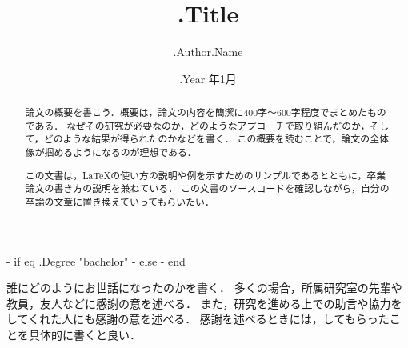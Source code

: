 \documentclass[12pt,twoside]{jsbook}
\begin{document}
\title{ {{ .Title }} }

{{- if eq .Degree "bachelor" }}
{{- else }}
{{- end }}

\author{ {{ .Author.Name }} }

\date{ {{ .Year }} 年1月}





\maketitle


\begin{abstract}
    論文の概要を書こう．概要は，論文の内容を簡潔に400字〜600字程度でまとめたものである．
    なぜその研究が必要なのか，どのようなアプローチで取り組んだのか，そして，どのような結果が得られたのかなどを書く．
    この概要を読むことで，論文の全体像が掴めるようになるのが理想である．

    この文書は，\LaTeX の使い方の説明や例を示すためのサンプルであるとともに，卒業論文の書き方の説明を兼ねている．
    この文書のソースコードを確認しながら，自分の卒論の文章に置き換えていってもらいたい．
\end{abstract}

\begin{acknowledgments}
誰にどのようにお世話になったのかを書く．
多くの場合，所属研究室の先輩や教員，友人などに感謝の意を述べる．
また，研究を進める上での助言や協力をしてくれた人にも感謝の意を述べる．
感謝を述べるときには，してもらったことを具体的に書くと良い．
\end{acknowledgments}


\tableofcontents       %

%
%
\end{document}
